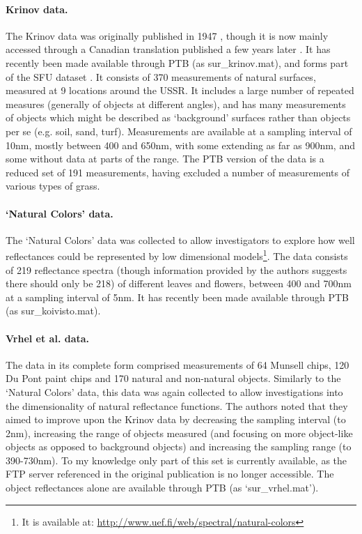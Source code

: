 \paragraph{Krinov data.}
The Krinov data was originally published in 1947 \citep{krinov_spektralnaya_1947}, though it is now mainly accessed through a Canadian translation published a few years later \cite{krinov_spectral_1953}. It has recently been made available through \gls{PTB} \cite{brainard_psychophysics_1997} (as sur\_krinov.mat), and forms part of the SFU dataset \cite{barnard_data_2002}. It consists of 370 measurements of natural surfaces, measured at 9 locations around the USSR. It includes a large number of repeated measures (generally of objects at different angles), and has many measurements of objects which might be described as `background' surfaces rather than objects per se (e.g. soil, sand, turf). Measurements are available at a sampling interval of 10nm, mostly between 400 and 650nm, with some extending as far as 900nm, and some without data at parts of the range. The \gls{PTB} version of the data is a reduced set of 191 measurements, having excluded a number of measurements of various types of grass. 

\paragraph{`Natural Colors' data.}
The `Natural Colors' data \citep{parkkinen_spectral_1988,jaaskelainen_vector-subspace_1990} was collected to allow investigators to explore how well reflectances could be represented by low dimensional models\footnote{It is available at: \url{http://www.uef.fi/web/spectral/natural-colors}}. The data consists of 219 reflectance spectra (though information provided by the authors suggests there should only be 218) of different leaves and flowers, between 400 and 700nm at a sampling interval of 5nm. It has recently been made available through \gls{PTB} (as sur\_koivisto.mat).

\paragraph{Vrhel et al. data.}
The \citet{vrhel_measurement_1994} data in its complete form comprised measurements of 64 Munsell chips, 120 Du Pont paint chips and 170 natural and non-natural objects. Similarly to the `Natural Colors' data, this data was again collected to allow investigations into the dimensionality of natural reflectance functions. The authors noted that they aimed to improve upon the Krinov data by decreasing the sampling interval (to 2nm), increasing the range of objects measured (and focusing on more object-like objects as opposed to background objects) and increasing the sampling range (to 390-730nm). To my knowledge only part of this set is currently available, as the FTP server referenced in the original publication is no longer accessible. The object reflectances alone are available through \gls{PTB} (as `sur\_vrhel.mat').

